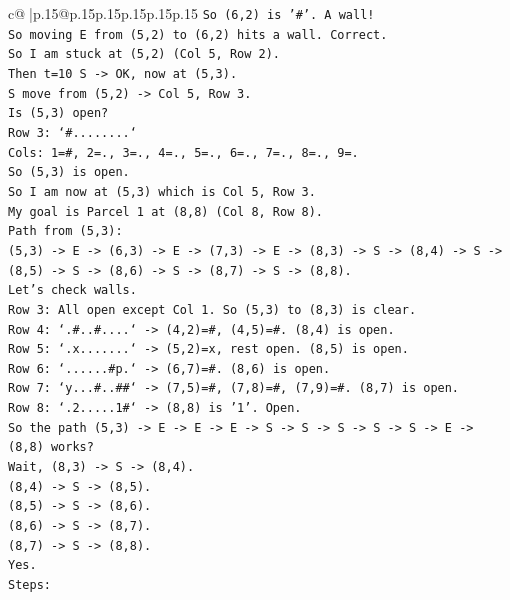\documentclass{article}
\begin{document}
{\begin{supertabular}{c@{$\;$}|p{.15\linewidth}@{}p{.15\linewidth}p{.15\linewidth}p{.15\linewidth}p{.15\linewidth}p{.15\linewidth}}
{{{\texttt{So (6,2) is '\#'. A wall!} \\
\texttt{So moving E from (5,2) to (6,2) hits a wall. Correct.} \\
\texttt{So I am stuck at (5,2) (Col 5, Row 2).} \\
\texttt{Then t=10 S {-}> OK, now at (5,3).} \\
\texttt{S move from (5,2) {-}> Col 5, Row 3.} \\
\texttt{Is (5,3) open?} \\
\texttt{Row 3: `\#........`} \\
\texttt{Cols: 1=\#, 2=., 3=., 4=., 5=., 6=., 7=., 8=., 9=.} \\
\texttt{So (5,3) is open.} \\
\texttt{So I am now at (5,3) which is Col 5, Row 3.} \\
\texttt{My goal is Parcel 1 at (8,8) (Col 8, Row 8).} \\
\texttt{Path from (5,3):} \\
\texttt{(5,3) {-}> E {-}> (6,3) {-}> E {-}> (7,3) {-}> E {-}> (8,3) {-}> S {-}> (8,4) {-}> S {-}> (8,5) {-}> S {-}> (8,6) {-}> S {-}> (8,7) {-}> S {-}> (8,8).} \\
\texttt{Let's check walls.} \\
\texttt{Row 3: All open except Col 1. So (5,3) to (8,3) is clear.} \\
\texttt{Row 4: `.\#..\#....` {-}> (4,2)=\#, (4,5)=\#. (8,4) is open.} \\
\texttt{Row 5: `.x.......` {-}> (5,2)=x, rest open. (8,5) is open.} \\
\texttt{Row 6: `......\#p.` {-}> (6,7)=\#. (8,6) is open.} \\
\texttt{Row 7: `y...\#..\#\#` {-}> (7,5)=\#, (7,8)=\#, (7,9)=\#. (8,7) is open.} \\
\texttt{Row 8: `.2.....1\#` {-}> (8,8) is '1'. Open.} \\
\texttt{So the path (5,3) {-}> E {-}> E {-}> E {-}> S {-}> S {-}> S {-}> S {-}> S {-}> E {-}> (8,8) works?} \\
\texttt{Wait, (8,3) {-}> S {-}> (8,4).} \\
\texttt{(8,4) {-}> S {-}> (8,5).} \\
\texttt{(8,5) {-}> S {-}> (8,6).} \\
\texttt{(8,6) {-}> S {-}> (8,7).} \\
\texttt{(8,7) {-}> S {-}> (8,8).} \\
\texttt{Yes.} \\
\texttt{Steps:} \\
}}}
\end{supertabular}}
\end{document}
